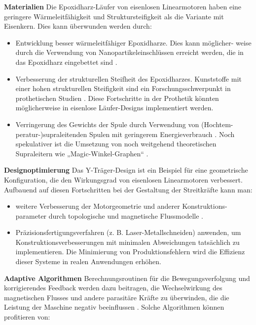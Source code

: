 \documentclass[
  oneside]{book}
\providecommand{\tightlist}{%
  \setlength{\itemsep}{0pt}\setlength{\parskip}{0pt}}
\begin{document}
\textbf{Materialien} Die Epoxidharz-Läufer von eisenlosen Linearmotoren haben eine geringere Wärmeleitfähigkeit und Struktursteifigkeit als die Variante mit Eisenkern. Dies kann überwunden werden durch:

\begin{itemize}
\tightlist
\item
  Entwicklung besser wärmeleitfähiger Epoxidharze. Dies kann möglicher- weise durch die Verwendung von Nanopartikeleinschlüssen erreicht werden, die in das Epoxidharz eingebettet sind \citep{fu2010}.
\item
  Verbesserung der strukturellen Steifheit des Epoxidharzes. Kunststoffe mit einer hohen strukturellen Steifigkeit sind ein Forschungsschwerpunkt in prothetischen Studien \citep{agha2016}. Diese Fortschritte in der Prothetik könnten möglicherweise in eisenlose Läufer-Designs implementiert werden.
\item
  Verringerung des Gewichts der Spule durch Verwendung von (Hochtem- peratur-)supraleitenden Spulen mit geringerem Energieverbrauch \citep{palka2021}. Noch spekulativer ist die Umsetzung von noch weitgehend theoretischen Supraleitern wie „Magic-Winkel-Graphen`` \citep{cao2018}.
\end{itemize}

\textbf{Designoptimierung} Das Y-Träger-Design ist ein Beispiel für eine geometrische Konfiguration, die den Wirkungsgrad von eisenlosen Linearmotoren verbessert. Aufbauend auf diesen Fortschritten bei der Gestaltung der Streitkräfte kann man:

\begin{itemize}
\tightlist
\item
  weitere Verbesserung der Motorgeometrie und anderer Konstruktions- parameter durch topologische und magnetische Flussmodelle \citep[z. B.][]{duan2011}.
\item
  Präzisionsfertigungsverfahren (z. B. Laser-Metallschneiden) anwenden, um Konstruktionsverbesserungen mit minimalen Abweichungen tatsächlich zu implementieren. Die Minimierung von Produktionsfehlern wird die Effizienz dieser Systeme in realen Anwendungen erhöhen.
\end{itemize}

\textbf{Adaptive Algorithmen} Berechnungsroutinen für die Bewegungsverfolgung und korrigierendes Feedback werden dazu beitragen, die Wechselwirkung des magnetischen Flusses und andere parasitäre Kräfte zu überwinden, die die Leistung der Maschine negativ beeinflussen \citep{nguyen2016}. Solche Algorithmen können profitieren von:
\end{document}
